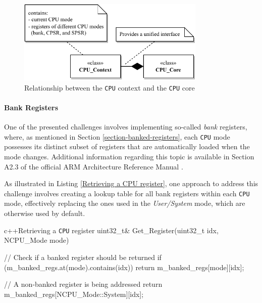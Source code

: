 \documentclass[english, ing, kiv, he, iso690numb, pdf]{fasthesis}
\begin{document}
	\begin{figure}[ht]
		\centering
		\includegraphics[width=0.8\textwidth]{img/diagrams/cpu_context.pdf}
		\caption{Relationship between the \texttt{CPU} context and the \texttt{CPU} core}
		\label{Relationship between the CPU context and the CPU core}
	\end{figure}
	
	\paragraph{Bank Registers}
	
	One of the presented challenges involves implementing so-called \textit{bank} registers, where, as mentioned in Section \ref{section-banked-registers}, each \texttt{CPU} mode possesses its distinct subset of registers that are automatically loaded when the mode changes. Additional information regarding this topic is available in Section A2.3 of the official ARM Architecture Reference Manual \cite{ARM_reference_manual}. 
	
	As illustrated in Listing \ref{Retrieving a CPU register}, one approach to address this challenge involves creating a lookup table for all bank registers within each \texttt{CPU} mode, effectively replacing the ones used in the \textit{User/System} mode, which are otherwise used by default.
	
	
\begin{code}{c++}{Retrieving a \texttt{CPU} register \label{Retrieving a CPU register}} 
uint32_t& Get_Register(uint32_t idx, NCPU_Mode mode) 
{
	// Check if a banked register should be returned
	if (m_banked_regs.at(mode).contains(idx))
		return m_banked_regs[mode][idx];
	
	// A non-banked register is being addressed
	return m_banked_regs[NCPU_Mode::System][idx];
}
\end{code}
	
\end{document}
